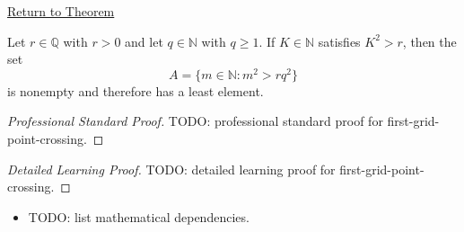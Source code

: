 \newpage
{}
\label{prf:first-grid-point-crossing}

\begin{remark*}[Return]
\hyperref[lem:first-grid-point-crossing]{Return to Theorem}
\end{remark*}

\begin{lemma*}
Let $r\in\mathbb{Q}$ with $r>0$ and let $q\in\mathbb{N}$ with $q\ge 1$.
If $K\in\mathbb{N}$ satisfies $K^2>r$, then the set
\[
A=\{m\in\mathbb{N}:m^2>rq^2\}
\]
is nonempty and therefore has a least element.
\end{lemma*}

\begin{proof}[Professional Standard Proof]
\LRAProofBodyStart
TODO: professional standard proof for first-grid-point-crossing.
\end{proof}

\begin{proof}[Detailed Learning Proof]
\LRAProofBodyStart
TODO: detailed learning proof for first-grid-point-crossing.
\end{proof}

\begin{remark*}
\end{remark*}

\begin{dependencies}
\begin{itemize}
  \item TODO: list mathematical dependencies.
\end{itemize}
\end{dependencies}

\clearpage
